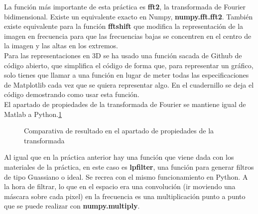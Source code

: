 \documentclass[a4paper,12pt]{report}
\begin{document}
La función más importante de esta práctica es \textbf{fft2}, la transformada de Fourier bidimensional. Existe un equivalente exacto en Numpy,  \textbf{numpy.fft.fft2}. También existe equivalente para la función \textbf{fftshift} que modifica la representación de la imagen en frecuencia para que las frecuencias bajas se concentren en el centro de la imagen y las altas en los extremos.\\

Para las representaciones en 3D se ha usado una función sacada de Github de código abierto, que simplifica el código de forma que, para representar un gráfico, solo tienes que llamar a una función en lugar de meter todas las especificaciones de Matplotlib cada vez que se quiera representar algo. En el cuadernillo se deja el código demostrando como usar esta función.\\

El apartado de propiedades de la transformada de Fourier se mantiene igual de Matlab a Python.\ref{zoom}\\

\begin{figure}[!tbp]
  \centering
  \hfill
  \caption{Comparativa de resultado en el apartado de propiedades de la transformada}
  \label{zoom}
\end{figure}

Al igual que en la práctica anterior hay una función que viene dada con los materiales de la práctica, en este caso es  \textbf{lpfilter}, una función para generar filtros de tipo Guassiano o ideal. Se recrea con el mismo funcionamiento en Python. A la hora de filtrar, lo que en el espacio era una convolución (ir moviendo una máscara sobre cada pixel) en la frecuencia es una multiplicación punto a punto que se puede realizar con \textbf{numpy.multiply}.\\
\end{document}
